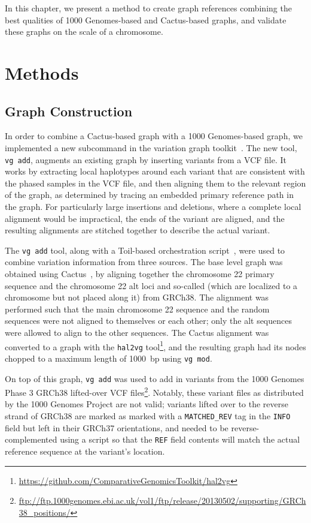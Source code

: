 In this chapter, we present a method to create graph references combining the best qualities of 1000 Genomes-based and Cactus-based graphs, and validate these graphs on the scale of a chromosome.

\section{Methods}

\subsection{Graph Construction}

In order to combine a Cactus-based graph with a 1000 Genomes-based graph, we implemented a new subcommand in the \vg variation graph toolkit~\cite{garrison2016vg}. The new tool, \texttt{vg add}, augments an existing graph by inserting variants from a VCF file. It works by extracting local haplotypes around each variant that are consistent with the phased samples in the VCF file, and then aligning them to the relevant region of the graph, as determined by tracing an embedded primary reference path in the graph. For particularly large insertions and deletions, where a complete local alignment would be impractical, the ends of the variant are aligned, and the resulting alignments are stitched together to describe the actual variant.

The \texttt{vg add} tool, along with a Toil-based orchestration script~\cite{vivian2017toil}, were used to combine variation information from three sources. The base level graph was obtained using Cactus~\cite{paten2011cactus2}, by aligning together the chromosome 22 primary sequence and the chromosome 22 alt loci and so-called  (which are localized to a chromosome but not placed along it) from GRCh38. The alignment was performed such that the main chromosome 22 sequence and the random sequences were not aligned to themselves or each other; only the alt sequences were allowed to align to the other sequences.
The Cactus alignment was converted to a \vg graph with the \texttt{hal2vg} tool\footnote{\url{https://github.com/ComparativeGenomicsToolkit/hal2vg}}, and the resulting graph had its nodes chopped to a maximum length of 1000~bp using \texttt{vg mod}.

\begin{sloppypar}
On top of this graph, \texttt{vg add} was used to add in variants from the 1000 Genomes Phase 3 GRCh38 lifted-over VCF files\footnote{\url{ftp://ftp.1000genomes.ebi.ac.uk/vol1/ftp/release/20130502/supporting/GRCh38_positions/}}. Notably, these variant files as distributed by the 1000 Genomes Project are not valid; variants lifted over to the reverse strand of GRCh38 are marked as marked with a \texttt{MATCHED\_REV} tag in the \texttt{INFO} field but left in their GRCh37 orientations, and needed to be reverse-complemented using a script so that the \texttt{REF} field contents will match the actual reference sequence at the variant's location.
\end{sloppypar}

